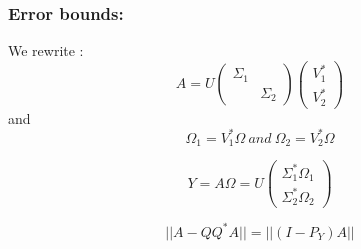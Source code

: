\documentclass[onecolumn,11pt]{article}
\begin{document}
\subsubsection{Error bounds:}
We rewrite :
$$A=U \begin{pmatrix}
\Sigma_1 & \\
 & \Sigma_2
\end{pmatrix}
\begin{pmatrix}
V_1^*\\
V_2^*
\end{pmatrix}
$$
and
$$\Omega_1=V_1^*\Omega\ and \  \Omega_2=V_2^*\Omega$$

$$Y=A\Omega=U\begin{pmatrix}
\Sigma_1^*\Omega_1\\
\Sigma_2^*\Omega_2
\end{pmatrix}$$

$$||A-QQ^* A||=||(I-P_Y)A||$$
\end{document}
